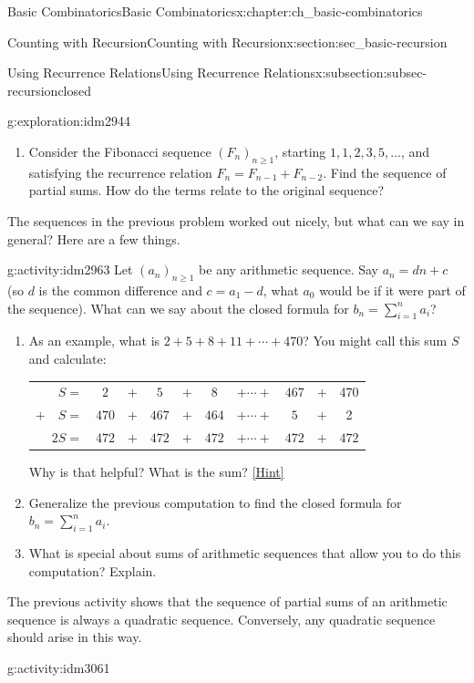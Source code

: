 \documentclass[oneside,10pt,]{book}
\numberwithin{equation}{chapter}
\newcommand{\hrulethin}  {\noalign{\hrule height 0.04em}}
\begin{document}
\begin{chapterptx}{Basic Combinatorics}{}{Basic Combinatorics}{}{}{x:chapter:ch_basic-combinatorics}
\begin{sectionptx}{Counting with Recursion}{}{Counting with Recursion}{}{}{x:section:sec_basic-recursion}
\begin{subsectionptx}{Using Recurrence Relations}{}{Using Recurrence Relations}{}{}{x:subsection:subsec-recursionclosed}
\begin{exploration}{}{g:exploration:idm2944}
\begin{enumerate}[font=\bfseries,label=(\alph*),ref=\alph*]
\item{}Consider the Fibonacci sequence \((F_n)_{n \ge 1}\), starting \(1, 1, 2, 3, 5, \ldots\), and satisfying the recurrence relation \(F_n = F_{n-1} + F_{n-2}\).  Find the sequence of partial sums.  How do the terms relate to the original sequence?%
\end{enumerate}
\end{exploration}
The sequences in the previous problem worked out nicely, but what can we say in general?  Here are a few things.%
\begin{activity}{}{g:activity:idm2963}%
Let \((a_n)_{n \ge 1}\) be any arithmetic sequence.  Say \(a_n = dn + c\) (so \(d\) is the common difference and \(c = a_1 - d\), what \(a_0\) would be if it were part of the sequence).  What can we say about the closed formula for \(b_n = \sum_{i=1}^n a_i\)?%
\begin{enumerate}[font=\bfseries,label=(\alph*),ref=\alph*]
\item{}As an example, what is \(2+5+8+11+\cdots + 470\)?  You might call this sum \(S\) and calculate:%
\begin{sidebyside}{1}{0}{0}{0}%
\begin{sbspanel}{1}%
{\centering%
\begin{tabular}{rccccccccc}
\(S  =\)&\(2\)&\(+\)&\(5\)&\(+\)&\(8\)&\(+ \cdots +\)&\(467\)&\(+\)&470\tabularnewline[0pt]
\(+ \quad S  =\)&\(470\)&\(+\)&\(467\)&\(+\)&\(464\)&\(+ \cdots +\)&\(5\)&\(+\)&2\tabularnewline\hrulethin
\(2S  =\)&\(472\)&\(+\)&\(472\)&\(+\)&\(472\)&\(+ \cdots +\)&\(472\)&\(+\)&\(472\)
\end{tabular}
\par}
\end{sbspanel}%
\end{sidebyside}%
\par
Why is that helpful?  What is the sum?%
\space\hspace*{0pt}\hfill{\tiny\hyperlink{g:hint:idm3051-back}{[Hint]}}\item{}Generalize the previous computation to find the closed formula for \(b_n = \sum_{i=1}^n a_i\).%
\item{}What is special about sums of arithmetic sequences that allow you to do this computation?  Explain.%
\end{enumerate}
\end{activity}
The previous activity shows that the sequence of partial sums of an arithmetic sequence is always a quadratic sequence.  Conversely, any quadratic sequence should arise in this way.%
\begin{activity}{}{g:activity:idm3061}%

\end{activity}
\end{subsectionptx}
\end{sectionptx}
\end{chapterptx}
\end{document}
